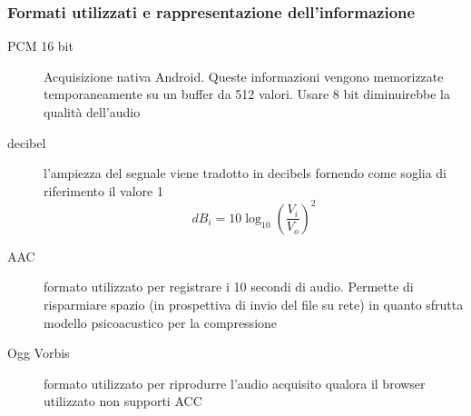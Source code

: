 \documentclass{beamer}
\begin{document}
\begin{frame}
\frametitle{Formati utilizzati e rappresentazione dell'informazione}
\begin{description}
  \item[PCM 16 bit] Acquisizione nativa Android. Queste informazioni vengono memorizzate temporaneamente su un buffer da 512 valori. Usare 8 bit diminuirebbe la qualità dell'audio
  \item[decibel] l'ampiezza del segnale viene tradotto in decibels fornendo come soglia di riferimento il valore 1
    {\footnotesize\[dB_i = 10\log_{10} \left(\frac{V_i}{V_o}\right)^2\]}
  \item[AAC] formato utilizzato per registrare i 10 secondi di audio. Permette di risparmiare spazio (in prospettiva di invio del file su rete) in quanto sfrutta modello psicoacustico per la compressione
  \item[Ogg Vorbis] formato utilizzato per riprodurre l'audio acquisito qualora il browser utilizzato non supporti ACC
\end{description}
\end{frame}
\end{document}
